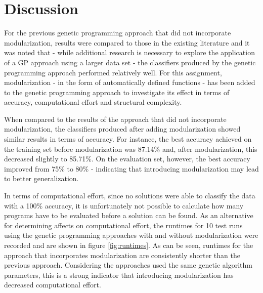 \section{Discussion}
For the previous genetic programming approach that did not incorporate modularization, results were compared to those in the existing literature \cite{owen1999tubular, luukka2009pca, dash2013comparative} and it was noted that - while additional research is necessary to explore the application of a GP approach using a larger data set - the classifiers produced by the genetic programming approach performed relatively well. For this assignment, modularization - in the form of automatically defined functions - has been added to the genetic programming approach to investigate its effect in terms of accuracy, computational effort and structural complexity. 

When compared to the results of the approach that did not incorporate modularization, the classifiers produced after adding modularization showed similar results in terms of accuracy. For instance, the best accuracy achieved on the training set before modularization was 87.14\% and, after modularization, this decreased slightly to 85.71\%. On the evaluation set, however, the best accuracy improved from 75\% to 80\% - indicating that introducing modularization may lead to better generalization.



In terms of computational effort, since no solutions were able to classify the data with a 100\% accuracy, it is unfortunately not possible to calculate how many programs have to be evaluated before a solution can be found. As an alternative for determining affects on computational effort, the runtimes for 10 test runs using the genetic programming approaches with and without modularization were recorded and are shown in figure \ref{fig:runtimes}. As can be seen, runtimes for the approach that incorporates modularization are consistently shorter than the previous approach. Considering the approaches used the same genetic algorithm parameters, this is a strong indicator that introducing modularization has decreased computational effort.

